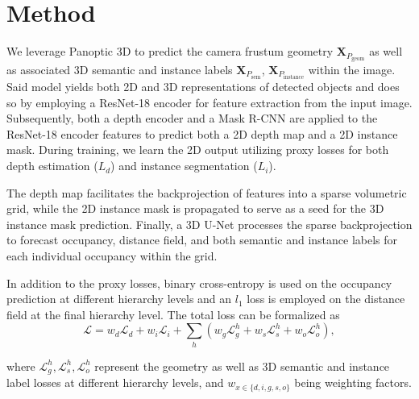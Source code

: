 \section{Method}
\label{sec:method}

We leverage Panoptic 3D \citep{dahnert2021panoptic} to predict the camera frustum geometry $\mathbf{X}_{P_{\text{geom}}}$ as well as associated 3D
semantic and instance labels $\mathbf{X}_{P_{\text{sem}}}$, $\mathbf{X}_{P_{\text{instance}}}$  within the image. Said model yields both 2D and 3D representations of detected objects and
does so by employing a ResNet-18 \citep{he2016deep} encoder for feature extraction from the input image. Subsequently,
both a depth encoder and a Mask R-CNN \citep{he2017mask} are applied to the ResNet-18 encoder features to predict both a 2D depth map
and a 2D instance mask.
During training, we learn the 2D output utilizing proxy losses for both depth estimation ($L_d$) and instance segmentation ($L_i$).


The depth map facilitates the backprojection of features into a sparse volumetric grid, while the 2D instance mask is propagated to serve as a seed for the 3D instance mask prediction. Finally, a 3D U-Net \citep{cciccek20163d} processes the sparse backprojection to forecast occupancy, distance field, and both semantic and instance labels for each individual occupancy within the grid.

In addition to the proxy losses, binary cross-entropy is used on the occupancy prediction at different hierarchy levels and an $l_1$ loss is employed on the distance field at the final hierarchy level.
The total loss can be formalized as 
\begin{equation}
    \mathcal{L} = w_d \mathcal{L}_d + w_i \mathcal{L}_i + \sum_h (w_g \mathcal{L}_g^h + w_s \mathcal{L}_s^h + w_o \mathcal{L}_o^h),
\end{equation}

where $\mathcal{L}_g^h, \mathcal{L}_s^h, \mathcal{L}_o^h$ represent the geometry as well as 3D semantic and instance label losses at different hierarchy levels, and $w_{x\in\{d, i, g, s, o\}}$ being weighting factors.

